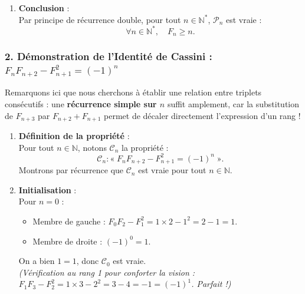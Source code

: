 \documentclass[11pt,a4paper]{article}
\newcommand{\N}{\mathbb{N}}
\begin{document}
\begin{correctionbox}
\begin{enumerate}[label=\textbf{\arabic*.}]
    \item \textbf{Conclusion} :\\
    Par principe de récurrence double, pour tout $n \in \N^*$, $\mathcal{P}_n$ est vraie :
    \[
    \forall n \in \N^*, \quad F_n \ge n.
    \]
\end{enumerate}

\subsubsection*{2. Démonstration de l'Identité de Cassini : $F_n F_{n+2} - F_{n+1}^2 = (-1)^n$}

Remarquons ici que nous cherchons à établir une relation entre triplets consécutifs : une \textbf{récurrence simple sur $n$} suffit amplement, car la substitution de $F_{n+3}$ par $F_{n+2} + F_{n+1}$ permet de décaler directement l'expression d'un rang !

\begin{enumerate}[label=\textbf{\arabic*.}]
    \item \textbf{Définition de la propriété} :\\
    Pour tout $n \in \N$, notons $\mathcal{C}_n$ la propriété :
    \[
    \mathcal{C}_n : « \; F_n F_{n+2} - F_{n+1}^2 = (-1)^n \; ».
    \]
    Montrons par récurrence que $\mathcal{C}_n$ est vraie pour tout $n \in \N$.

    \item \textbf{Initialisation} :\\
    Pour $n = 0$ :
    \begin{itemize}
        \item Membre de gauche : $F_0 F_2 - F_1^2 = 1 \times 2 - 1^2 = 2 - 1 = 1$.
        \item Membre de droite : $(-1)^0 = 1$.
    \end{itemize}
    On a bien $1 = 1$, donc $\mathcal{C}_0$ est vraie.\\
    \textit{(Vérification au rang 1 pour conforter la vision : $F_1 F_3 - F_2^2 = 1 \times 3 - 2^2 = 3 - 4 = -1 = (-1)^1$. Parfait !)}


\end{enumerate}
\end{correctionbox}
\end{document}
